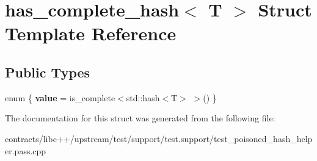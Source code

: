 \hypertarget{structhas__complete__hash}{}\section{has\+\_\+complete\+\_\+hash$<$ T $>$ Struct Template Reference}
\label{structhas__complete__hash}
\subsection*{Public Types}
\begin{DoxyCompactItemize}
\item 
\mbox{\label{structhas__complete__hash_ad056b62b730f43f98f5ca6eb2baf3ee2}} 
enum \{ {\bfseries value} = is\+\_\+complete$<$std\+:\+:hash$<$T$>$ $>$()
 \}
\end{DoxyCompactItemize}


The documentation for this struct was generated from the following file\+:\begin{DoxyCompactItemize}
\item 
contracts/libc++/upstream/test/support/test.\+support/test\+\_\+poisoned\+\_\+hash\+\_\+helper.\+pass.\+cpp\end{DoxyCompactItemize}
